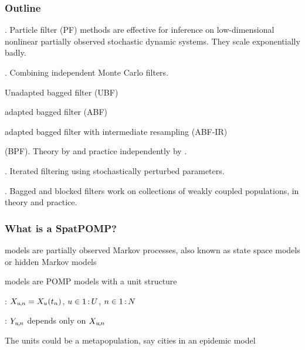 \documentclass{beamer}
\begin{document}
\begin{frame}
  \frametitle{Outline}

  
  . Particle filter (PF) methods are effective for inference on low-dimensional nonlinear partially observed stochastic dynamic systems. They scale exponentially badly.

  \challengeSep
  
  . Combining independent Monte Carlo filters.

  \vspace{1mm}
  
  \begin{myitemize}
  \item Unadapted bagged filter (UBF)
  \item adapted bagged filter (ABF)
    \item adapted bagged filter with intermediate resampling (ABF-IR)
  \end{myitemize}

  \challengeSep

   (BPF). Theory by \citet{rebeschini15} and practice independently by \citet{ng02}.

  \challengeSep

  . Iterated filtering using stochastically perturbed parameters.

  \challengeSep

  . Bagged and blocked filters work on collections of weakly coupled populations, in theory and practice.

\end{frame}

\begin{frame}

  \frametitle{What is a SpatPOMP?}

   models are partially observed Markov processes, also known as state space models or hidden Markov models

  \vspace{6mm}
  
   models are POMP models with a unit structure

    \vspace{6mm}
 
  : $X_{u{\hspace{-0.25mm},\hspace{-0.2mm}}n}=X_{u}(t_n)$, \hspace{1mm} $u\in 1{{\hspace{0.6mm}:\hspace{0.6mm}}}U$, \hspace{1mm} $n\in 1{{\hspace{0.6mm}:\hspace{0.6mm}}}N$

    \vspace{6mm}
 
  : $Y_{u{\hspace{-0.25mm},\hspace{-0.2mm}}n}$ depends only on $X_{u{\hspace{-0.25mm},\hspace{-0.2mm}}n}$

    \vspace{6mm}
 
The units could be a metapopulation, say cities in an epidemic model

\end{frame}
\end{document}
